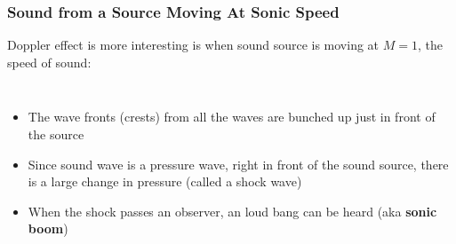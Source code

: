 \documentclass[12pt,aspectratio=169]{beamer}
\begin{document}
\begin{frame}
  \frametitle{Sound from a Source Moving At Sonic Speed}
  Doppler effect is more interesting is when sound source is moving at $M=1$,
  the speed of sound:
  \vspace{.2in}
  \begin{columns}
    
      
    \begin{itemize}
    \item The wave fronts (crests) from all the waves are bunched up just in
      front of the source
    \item Since sound wave is a pressure wave, right in front of the sound
      source, there is a large change in pressure (called a shock wave)
    \item When the shock passes an observer, an loud bang can be heard (aka
      \textbf{sonic boom})
    \end{itemize}
  \end{columns}
\end{frame}
\end{document}
